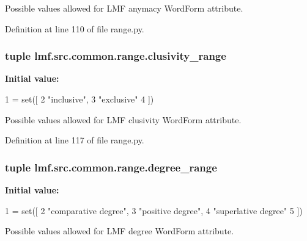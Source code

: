 Possible values allowed for L\+M\+F anymacy Word\+Form attribute. 



Definition at line 110 of file range.\+py.

\hypertarget{namespacelmf_1_1src_1_1common_1_1range_aa39563f49d7d421ce4b55d2385f3a7f7}{
\subsubsection[{clusivity\+\_\+range}]{\setlength{\rightskip}{0pt plus 5cm}tuple lmf.\+src.\+common.\+range.\+clusivity\+\_\+range}}\label{namespacelmf_1_1src_1_1common_1_1range_aa39563f49d7d421ce4b55d2385f3a7f7}
{\bfseries Initial value\+:}
\begin{DoxyCode}
1 = set([
2     \textcolor{stringliteral}{"inclusive"},
3     \textcolor{stringliteral}{"exclusive"}
4 ])
\end{DoxyCode}


Possible values allowed for L\+M\+F clusivity Word\+Form attribute. 



Definition at line 117 of file range.\+py.

\hypertarget{namespacelmf_1_1src_1_1common_1_1range_a38a6c009293e81b8b03b7072692f7a3c}{
\subsubsection[{degree\+\_\+range}]{\setlength{\rightskip}{0pt plus 5cm}tuple lmf.\+src.\+common.\+range.\+degree\+\_\+range}}\label{namespacelmf_1_1src_1_1common_1_1range_a38a6c009293e81b8b03b7072692f7a3c}
{\bfseries Initial value\+:}
\begin{DoxyCode}
1 = set([
2     \textcolor{stringliteral}{"comparative degree"},
3     \textcolor{stringliteral}{"positive degree"},
4     \textcolor{stringliteral}{"superlative degree"}
5 ])
\end{DoxyCode}


Possible values allowed for L\+M\+F degree Word\+Form attribute. 



